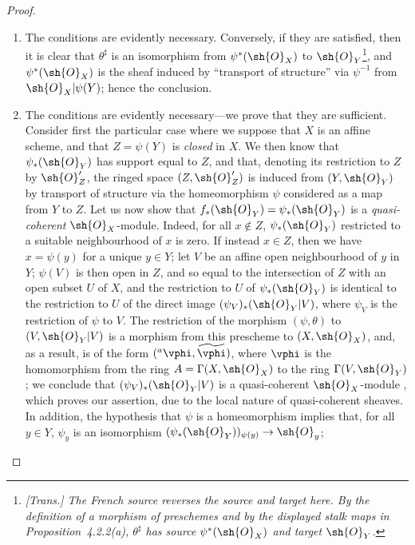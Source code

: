 \begin{proof}
\medskip\noindent
\begin{enumerate}
  \item[(a)] The conditions are evidently necessary.
    Conversely, if they are satisfied, then it is clear that $\theta^\sharp$ is an isomorphism from $\psi^*(\sh{O}_X)$ to $\sh{O}_Y$\footnote{\emph{[Trans.] The French source reverses the source and target here. By the definition of a morphism of preschemes and by the displayed stalk maps in Proposition~4.2.2(a), $\theta^\sharp$ has source $\psi^*(\sh{O}_X)$ and target $\sh{O}_Y$.}}, and $\psi^*(\sh{O}_X)$ is the sheaf induced by ``transport of structure'' via $\psi^{-1}$ from $\sh{O}_X|\psi(Y)$;
    hence the conclusion.
  \item[(b)] The conditions are evidently necessary---we prove that they are sufficient.
    Consider first the particular case where we suppose that $X$ is an affine scheme, and that $Z=\psi(Y)$ is \emph{closed} in $X$.
    We then know  that $\psi_*(\sh{O}_Y)$ has support equal to $Z$, and that, denoting its restriction to $Z$ by $\sh{O}_Z'$, the ringed space $(Z,\sh{O}_Z')$ is induced from $(Y,\sh{O}_Y)$ by transport of structure via the homeomorphism $\psi$ considered as a map from $Y$ to $Z$.
    Let us now show that $f_*(\sh{O}_Y)=\psi_*(\sh{O}_Y)$ is a \emph{quasi-coherent} $\sh{O}_X$-module.
    Indeed, for all $x\not\in Z$, $\psi_*(\sh{O}_Y)$ restricted to a suitable neighbourhood of $x$ is zero.
    If instead $x\in Z$, then we have $x=\psi(y)$ for a unique $y\in Y$;
    let $V$ be an affine open neighbourhood of $y$ in $Y$;
    $\psi(V)$ is then open in $Z$, and so equal to the intersection of $Z$ with an open subset $U$ of $X$, and the restriction to $U$ of $\psi_*(\sh{O}_Y)$ is identical to the restriction to $U$ of the direct image
    $(\psi_V)_*(\sh{O}_Y|V)$, where $\psi_V$ is the restriction of $\psi$ to $V$.
    The restriction of the morphism $(\psi,\theta)$ to $(V,\sh{O}_Y|V)$ is a morphism from this prescheme to $(X,\sh{O}_X)$, and, as a result, is of the form $({}^a\vphi,\widetilde{\vphi})$, where $\vphi$ is the homomorphism from the ring $A=\Gamma(X,\sh{O}_X)$ to the ring $\Gamma(V,\sh{O}_Y)$ ;
    we conclude that $(\psi_V)_*(\sh{O}_Y|V)$ is a quasi-coherent $\sh{O}_X$-module , which proves our assertion, due to the local nature of quasi-coherent sheaves.
    In addition, the hypothesis that $\psi$ is a homeomorphism implies  that, for all $y\in Y$, $\psi_y$ is an isomorphism $(\psi_*(\sh{O}_Y))_{\psi(y)}\to\sh{O}_y$;

\end{enumerate}
\end{proof}
